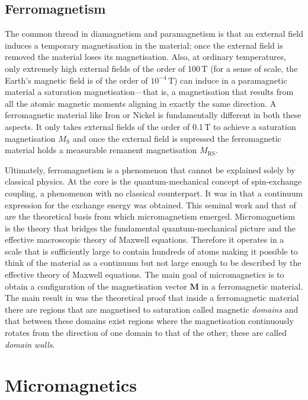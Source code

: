 \subsection{Ferromagnetism}
The common thread in diamagnetism and paramagnetism is that an external field induces a temporary magnetisation in the material; once the external field is removed the material loses its magnetisation. Also, at ordinary temperatures, only extremely high external fields of the order of 100$\,\text{T}$ (for a sense of scale, the Earth's magnetic field is of the order of $10^{-4}\,\text{T}$) can induce in a paramagnetic material a saturation magnetisation---that is, a magnetisation that results from all the atomic magnetic moments aligning in exactly the same direction. A ferromagnetic material like Iron or Nickel is fundamentally different in both these aspects. It only takes external fields of the order of 0.1$\,\text{T}$ to achieve a saturation magnetisation $M_\text{S}$ and once the external field is supressed the ferromagnetic material holds a measurable remanent magnetisation $M_\text{RS}$.\par

Ultimately, ferromagnetism is a phenomenon that cannot be explained solely by classical physics. At the core is the quantum-mechanical concept of spin-exchange coupling, a phenomenon with no classical counterpart. It was in \citet{Landau1935} that a continuum expression for the exchange energy was obtained. This seminal work and that of \citet{Brown} are the theoretical basis from which micromagnetism emerged. Micromagnetism is the theory that bridges the fundamental quantum-mechanical picture and the effective macroscopic theory of Maxwell equations. Therefore it operates in a scale that is sufficiently large to contain hundreds of atoms making it possible to think of the material as a continuum but not large enough to be described by the effective theory of Maxwell equations. The main goal of micromagnetics is to obtain a configuration of the magnetisation vector $\boldsymbol{M}$ in a ferromagnetic material. The main result in \citet{Landau1935} was the theoretical proof that inside a ferromagnetic material there are regions that are magnetised to saturation called magnetic \textit{domains} and that between these domains exist regions where the magnetisation continuously rotates from the direction of one domain to that of the other; these are called \textit{domain walls}.\par

\section{Micromagnetics}
